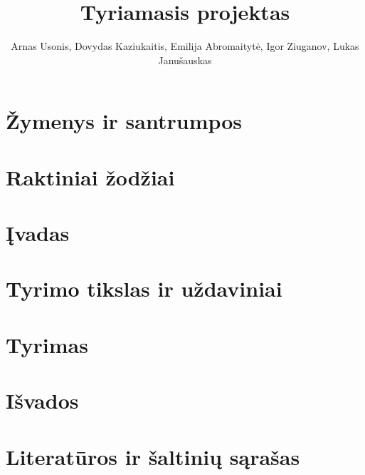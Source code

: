 \documentclass{article}
\title{Tyriamasis projektas}
\author{Arnas Usonis, Dovydas Kaziukaitis, Emilija Abromaitytė, Igor Ziuganov, Lukas Janušauskas}
\date{ }
\begin{document}
\maketitle

\section{Žymenys ir santrumpos}


\section{Raktiniai žodžiai}


\section{Įvadas}


\section{Tyrimo tikslas ir uždaviniai}


\section{Tyrimas}


\section{Išvados}


\section{Literatūros ir šaltinių sąrašas}

\end{document}
